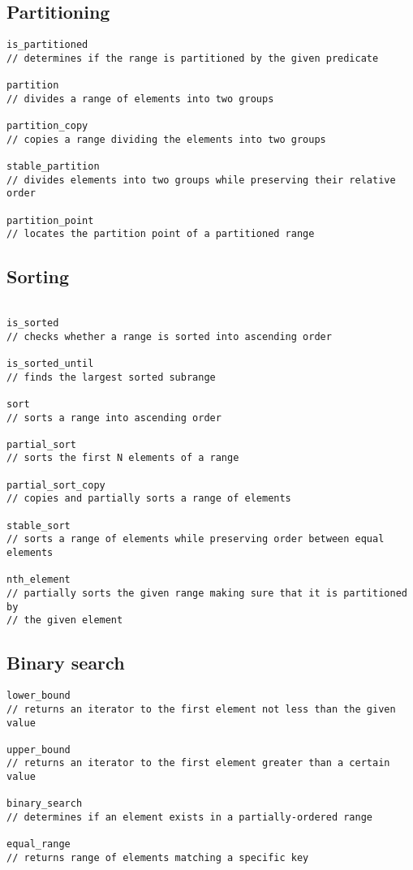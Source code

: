 \documentclass[10pt, oneside]{Book}
\begin{document}
\subsection{Partitioning}
\begin{verbatim}
is_partitioned
// determines if the range is partitioned by the given predicate

partition
// divides a range of elements into two groups

partition_copy
// copies a range dividing the elements into two groups

stable_partition
// divides elements into two groups while preserving their relative order

partition_point
// locates the partition point of a partitioned range
\end{verbatim}
\subsection{Sorting}
\begin{verbatim}

is_sorted
// checks whether a range is sorted into ascending order

is_sorted_until
// finds the largest sorted subrange

sort
// sorts a range into ascending order

partial_sort
// sorts the first N elements of a range

partial_sort_copy
// copies and partially sorts a range of elements

stable_sort
// sorts a range of elements while preserving order between equal elements

nth_element
// partially sorts the given range making sure that it is partitioned by 
// the given element
\end{verbatim}
\subsection{Binary search}
\begin{verbatim}
lower_bound
// returns an iterator to the first element not less than the given value

upper_bound
// returns an iterator to the first element greater than a certain value

binary_search
// determines if an element exists in a partially-ordered range

equal_range
// returns range of elements matching a specific key
\end{verbatim}
\end{document}
